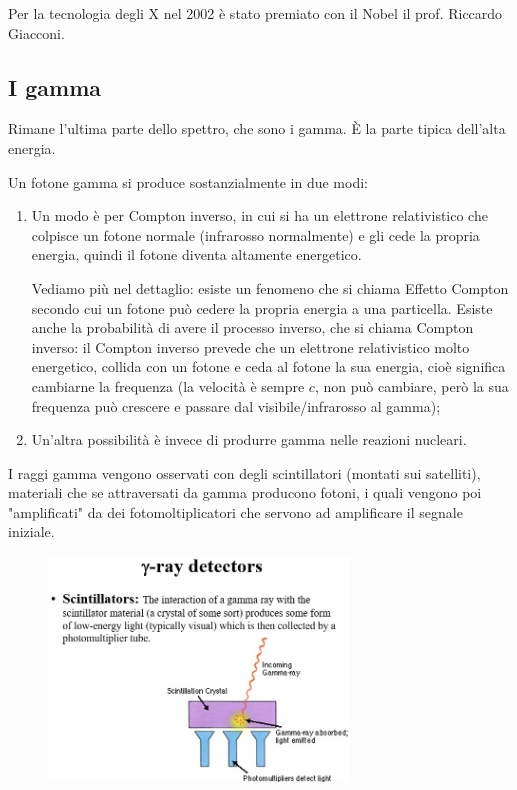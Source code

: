 \vspace{0.2cm}Per la tecnologia degli X nel 2002 è stato premiato con il Nobel il prof. Riccardo Giacconi.

\subsection{I gamma}

Rimane l'ultima parte dello spettro, che sono i gamma. È la parte tipica dell'alta energia.

Un fotone gamma si produce sostanzialmente in due modi:

\begin{enumerate}
    \item Un modo è per Compton inverso, in cui si ha un elettrone relativistico che colpisce un fotone normale (infrarosso normalmente) e gli cede la propria energia, quindi il fotone diventa altamente energetico.
    
    Vediamo più nel dettaglio: esiste un fenomeno che si chiama Effetto Compton secondo cui un fotone può cedere la propria energia a una particella. Esiste anche la probabilità di avere il processo inverso, che si chiama Compton inverso: il Compton inverso prevede che un elettrone relativistico molto energetico, collida con un fotone e ceda al fotone la sua energia, cioè significa cambiarne la frequenza (la velocità è sempre $c$, non può cambiare, però la sua frequenza può crescere e passare dal visibile/infrarosso al gamma);
    \item Un'altra possibilità è invece di produrre gamma nelle reazioni nucleari.
\end{enumerate}

I raggi gamma vengono osservati con degli scintillatori (montati sui satelliti), materiali che se attraversati da gamma producono fotoni, i quali vengono poi "amplificati" da dei fotomoltiplicatori che servono ad amplificare il segnale iniziale.

\begin{figure}[H]
    \centering
    \includegraphics[width=8cm]{38.jpg}
\end{figure}

